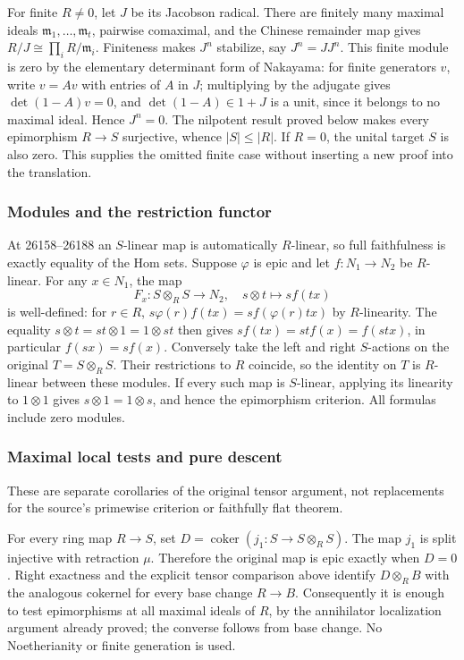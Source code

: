 For finite \(R\ne0\), let \(J\) be its Jacobson radical. There are finitely many maximal ideals \(\mathfrak m_1,\ldots,\mathfrak m_t\), pairwise comaximal, and the Chinese remainder map gives \(R/J\cong\prod_iR/\mathfrak m_i\). Finiteness makes \(J^n\) stabilize, say \(J^n=J J^n\). This finite module is zero by the elementary determinant form of Nakayama: for finite generators \(v\), write \(v=A v\) with entries of \(A\) in \(J\); multiplying by the adjugate gives \(\det(1-A)v=0\), and \(\det(1-A)\in1+J\) is a unit, since it belongs to no maximal ideal. Hence \(J^n=0\). The nilpotent result proved below makes every epimorphism \(R\to S\) surjective, whence \(|S|\leq|R|\). If \(R=0\), the unital target \(S\) is also zero. This supplies the omitted finite case without inserting a new proof into the translation.

\subsubsection{Modules and the restriction functor}\label{algebra-proof-021-modules-and-the-restriction-functor}

At 26158--26188 an \(S\)-linear map is automatically \(R\)-linear, so full faithfulness is exactly equality of the Hom sets. Suppose \(\varphi\) is epic and let \(f:N_1\to N_2\) be \(R\)-linear. For any \(x\in N_1\), the map \[
F_x:S\otimes_RS\to N_2,\quad s\otimes t\mapsto s f(tx)
\] is well-defined: for \(r\in R\), \(s\varphi(r)f(tx)=s f(\varphi(r)tx)\) by \(R\)-linearity. The equality \(s\otimes t=st\otimes1=1\otimes st\) then gives \(s f(tx)=st f(x)=f(stx)\), in particular \(f(sx)=s f(x)\). Conversely take the left and right \(S\)-actions on the original \(T=S\otimes_RS\). Their restrictions to \(R\) coincide, so the identity on \(T\) is \(R\)-linear between these modules. If every such map is \(S\)-linear, applying its linearity to \(1\otimes1\) gives \(s\otimes1=1\otimes s\), and hence the epimorphism criterion. All formulas include zero modules.

\subsubsection{Maximal local tests and pure descent}\label{algebra-proof-021-maximal-local-tests-and-pure-descent}

These are separate corollaries of the original tensor argument, not replacements for the source's primewise criterion or faithfully flat theorem.

For every ring map \(R\to S\), set \(D=\operatorname{coker}(j_1:S\to S\otimes_RS)\). The map \(j_1\) is split injective with retraction \(\mu\). Therefore the original map is epic exactly when \(D=0\). Right exactness and the explicit tensor comparison above identify \(D\otimes_RB\) with the analogous cokernel for every base change \(R\to B\). Consequently it is enough to test epimorphisms at all maximal ideals of \(R\), by the annihilator localization argument already proved; the converse follows from base change. No Noetherianity or finite generation is used.


